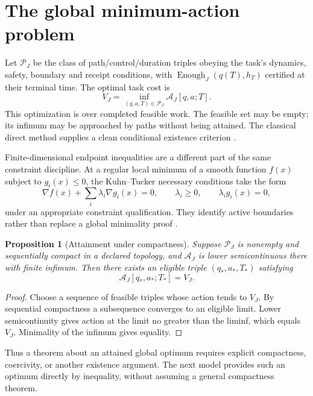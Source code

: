 \documentclass[11pt,letterpaper]{article}
\newtheorem{proposition}{Proposition}
\theoremstyle{definition}\newtheorem{definition}{Definition}
\newcommand{\Enough}{\operatorname{Enough}}
\newcommand{\Act}{\mathcal A}
\begin{document}
\section{The global minimum-action problem}
Let $\mathcal P_J$ be the class of path/control/duration triples obeying the task's dynamics, safety, boundary and receipt conditions, with $\Enough_J(q(T),h_T)$ certified at their terminal time. The optimal task cost is
\begin{equation}\label{eq:opt}
\boxed{V_J=\inf_{(q,a,T)\in\mathcal P_J}\Act_J[q,a;T].}
\end{equation}
This optimization is over completed feasible work. The feasible set may be empty; its infimum may be approached by paths without being attained. The classical direct method supplies a clean conditional existence criterion \cite{tonelli,rockafellar}.

Finite-dimensional endpoint inequalities are a different part of the same constraint discipline. At a regular local minimum of a smooth function $f(x)$ subject to $g_i(x)\le0$, the Kuhn--Tucker necessary conditions take the form
\[
\nabla f(x)+\sum_i\lambda_i\nabla g_i(x)=0,\qquad
\lambda_i\ge0,\qquad \lambda_i g_i(x)=0,
\]
under an appropriate constraint qualification. They identify active boundaries rather than replace a global minimality proof \cite{kuhntucker}.

\begin{proposition}[Attainment under compactness]\label{prop:attain}
Suppose $\mathcal P_J$ is nonempty and sequentially compact in a declared topology, and $\Act_J$ is lower semicontinuous there with finite infimum. Then there exists an eligible triple $(q_*,a_*,T_*)$ satisfying
\[
\Act_J[q_*,a_*;T_*]=V_J.
\]
\end{proposition}
\begin{proof}
Choose a sequence of feasible triples whose action tends to $V_J$. By sequential compactness a subsequence converges to an eligible limit. Lower semicontinuity gives action at the limit no greater than the liminf, which equals $V_J$. Minimality of the infimum gives equality.
\end{proof}

Thus a theorem about an attained global optimum requires explicit compactness, coercivity, or another existence argument. The next model provides such an optimum directly by inequality, without assuming a general compactness theorem.
\end{document}
